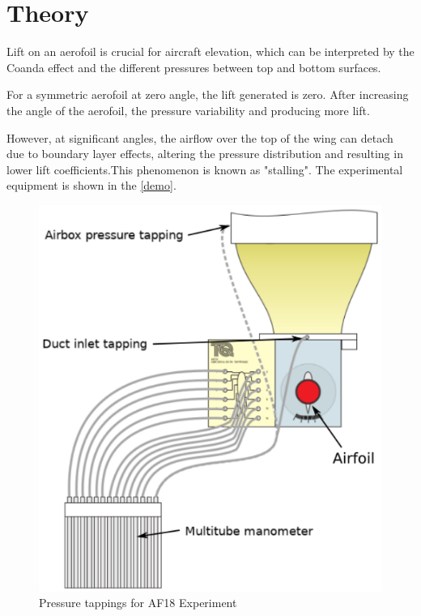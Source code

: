 \section{Theory}
\FloatBarrier %

Lift on an aerofoil is crucial for aircraft elevation, which can be interpreted by the Coanda effect and the different pressures between top and bottom surfaces. 

For a symmetric aerofoil at zero angle, the lift generated is zero. 
After increasing the angle of the aerofoil, the pressure variability and producing more lift. 

However, at significant angles, the airflow over the top of the wing can detach due to boundary layer effects, altering the pressure distribution and resulting in lower lift coefficients.This phenomenon is known as "stalling".
The experimental equipment is shown in the \autoref{demo}.
\begin{figure}[htbp] %
    \centering
    \includegraphics[scale=0.3]{fig/AF18.png}
    \caption{Pressure tappings for AF18 Experiment}
    \label{demo}
\end{figure}
